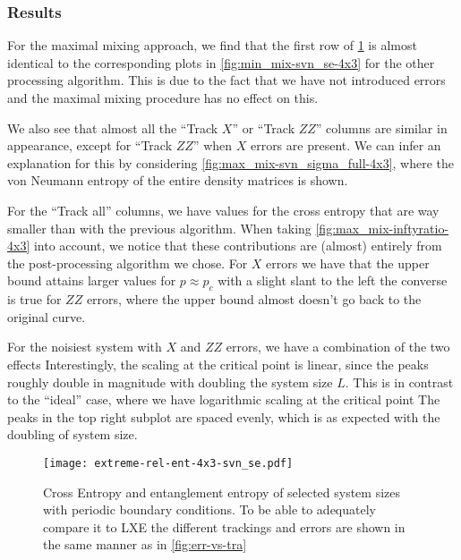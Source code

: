 \subsubsection{Results}
 
For the maximal mixing approach, we find that the first row of
\cref{fig:max_mix-svn_se-4x3} is almost identical to the corresponding plots in
\cref{fig:min_mix-svn_se-4x3} for the other processing algorithm.  This is due
to the fact that we have not introduced errors and the maximal mixing procedure
has no effect on this.
 
We also see that almost all the \enquote{Track $X$} or \enquote{Track $ZZ$}
columns are similar in appearance, except for \enquote{Track $ZZ$} when $X$
errors are present. We can infer an explanation for this by considering
\cref{fig:max_mix-svn_sigma_full-4x3}, where the von Neumann entropy of the
entire density matrices is shown.
 
For the \enquote{Track all} columns, we have values for the cross entropy that
are way smaller than with the previous algorithm.  When taking
\cref{fig:max_mix-inftyratio-4x3} into account, we notice that these
contributions are (almost) entirely from the post-processing algorithm we
chose.  For $X$ errors we have that the upper bound attains larger values for
$p \approx p_c$ with a slight slant to the left the converse is true for $ZZ$
errors, where the upper bound almost doesn't go back to the original curve.
 
For the noisiest system with $X$ and $ZZ$ errors, we have a combination of the
two effects Interestingly, the scaling at the critical point is linear, since
the peaks roughly double in magnitude with doubling the system size $L$.  This
is in contrast to the \enquote{ideal} case, where we have logarithmic scaling
at the critical point The peaks in the top right subplot are spaced evenly,
which is as expected with the doubling of system size.

\begin{figure}[p]
  \centering
  \texttt{[image: extreme-rel-ent-4x3-svn\_se.pdf]}
  \caption{Cross Entropy and entanglement entropy of selected system sizes with
  periodic boundary conditions. To be able to adequately compare it to LXE the
different trackings and errors are shown in the same manner as in
\cref{fig:err-vs-tra}}
  \label{fig:max_mix-svn_se-4x3}
\end{figure}
  
